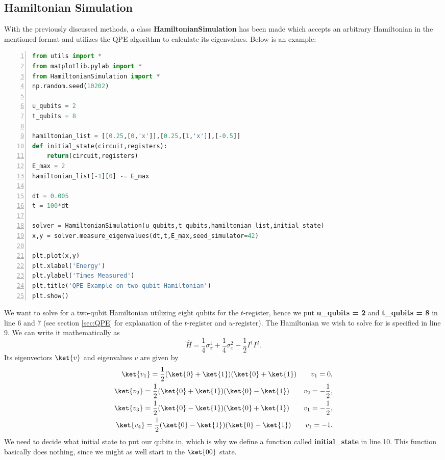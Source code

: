 \subsection{Hamiltonian Simulation}
\label{subsec:MethodsHamiltonianSimulation}
With the previously discussed methods, a class \textbf{HamiltonianSimulation} has been made which accepts an arbitrary Hamiltonian in the mentioned format and utilizes the QPE algorithm to calculate its eigenvalues. Below is an example:
\begin{lstlisting}[language=Python,numbers=left]
from utils import *
from matplotlib.pylab import *
from HamiltonianSimulation import *
np.random.seed(10202)

u_qubits = 2
t_qubits = 8

hamiltonian_list = [[0.25,[0,'x']],[0.25,[1,'x']],[-0.5]]
def initial_state(circuit,registers):
	return(circuit,registers)
E_max = 2
hamiltonian_list[-1][0] -= E_max

dt = 0.005
t = 100*dt

solver = HamiltonianSimulation(u_qubits,t_qubits,hamiltonian_list,initial_state)
x,y = solver.measure_eigenvalues(dt,t,E_max,seed_simulator=42)

plt.plot(x,y)
plt.xlabel('Energy')
plt.ylabel('Times Measured')
plt.title('QPE Example on two-qubit Hamiltonian')
plt.show()
\end{lstlisting}
We want to solve for a two-qubit Hamiltonian utilizing eight qubits for the $t$-register, hence we put \textbf{u\_qubits = 2} and \textbf{t\_qubits = 8} in line 6 and 7 (see section \ref{sec:QPE} for explanation of the $t$-register and $u$-register). 
The Hamiltonian we wish to solve for is specified in line 9. We can write it mathematically as
$$\hat{H} = \frac{1}{4} \sigma_x^1 + \frac{1}{4} \sigma_x^2 - \frac{1}{2}I^1 I^2.$$
Its eigenvectors $\ket{v}$ and eigenvalues $v$ are given by
\begin{align*}
    \ket{v_1} = \frac{1}{2}(\ket{0} + \ket{1})(\ket{0} + \ket{1}) \qquad v_1 = 0, \\
     \ket{v_2} = \frac{1}{2}(\ket{0} + \ket{1})(\ket{0} - \ket{1}) \qquad v_2 = -\frac{1}{2}, \\
     \ket{v_3} = \frac{1}{2}(\ket{0} - \ket{1})(\ket{0} + \ket{1}) \qquad v_1 = -\frac{1}{2},  \\
     \ket{v_4} = \frac{1}{2}(\ket{0} - \ket{1})(\ket{0} - \ket{1}) \qquad v_1 = -1.
\end{align*}
We need to decide what initial state to put our qubits in, which is why we define a function called \textbf{initial\_state} in line 10. This function basically does nothing, since we might as well start in the $\ket{00}$ state.
